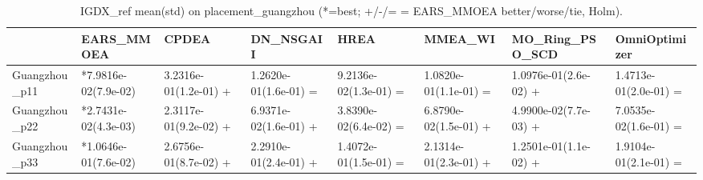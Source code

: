 \begin{table}[t]
\centering
\caption{IGDX_ref mean(std) on placement_guangzhou (*=best; +/-/= = EARS_MMOEA better/worse/tie, Holm).}
\label{tab:placement_guangzhou_IGDX_ref}
\begin{tabular}{llllllll}
\toprule
 & EARS\_MMOEA & CPDEA & DN\_NSGAII & HREA & MMEA\_WI & MO\_Ring\_PSO\_SCD & OmniOptimizer \\
\midrule
Guangzhou\_p11 & *7.9816e-02(7.9e-02) & 3.2316e-01(1.2e-01) + & 1.2620e-01(1.6e-01) = & 9.2136e-02(1.3e-01) = & 1.0820e-01(1.1e-01) = & 1.0976e-01(2.6e-02) + & 1.4713e-01(2.0e-01) = \\
Guangzhou\_p22 & *2.7431e-02(4.3e-03) & 2.3117e-01(9.2e-02) + & 6.9371e-02(1.6e-01) + & 3.8390e-02(6.4e-02) = & 6.8790e-02(1.5e-01) + & 4.9900e-02(7.7e-03) + & 7.0535e-02(1.6e-01) = \\
Guangzhou\_p33 & *1.0646e-01(7.6e-02) & 2.6756e-01(8.7e-02) + & 2.2910e-01(2.4e-01) + & 1.4072e-01(1.5e-01) = & 2.1314e-01(2.3e-01) + & 1.2501e-01(1.1e-02) + & 1.9104e-01(2.1e-01) = \\
\bottomrule
\end{tabular}
\end{table}
